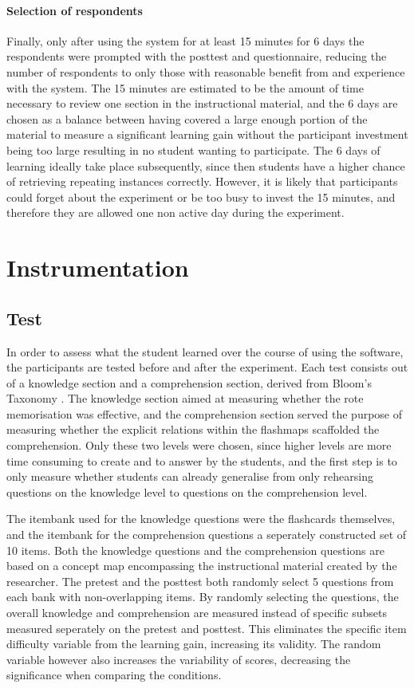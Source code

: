 \paragraph{Selection of respondents} Finally, only after using the system for at least 15 minutes for 6 days the respondents were prompted with the posttest and questionnaire, reducing the number of respondents to only those with reasonable benefit from and experience with the system. The 15 minutes are estimated to be the amount of time necessary to review one section in the instructional material, and the 6 days are chosen as a balance between having covered a large enough portion of the material to measure a significant learning gain without the participant investment being too large resulting in no student wanting to participate. The 6 days of learning ideally take place subsequently, since then students have a higher chance of retrieving repeating instances correctly. However, it is likely that participants could forget about the experiment or be too busy to invest the 15 minutes, and therefore they are allowed one non active day during the experiment. 

\section{Instrumentation}
\label{sec:instrumentation}

\subsection{Test}

In order to assess what the student learned over the course of using the software, the participants are tested before and after the experiment. Each test consists out of a knowledge section and a comprehension section, derived from Bloom's Taxonomy \cite{bloom}. The knowledge section aimed at measuring whether the rote memorisation was effective, and the comprehension section served the purpose of measuring whether the explicit relations within the flashmaps scaffolded the comprehension. Only these two levels were chosen, since higher levels are more time consuming to create and to answer by the students, and the first step is to only measure whether students can already generalise from only rehearsing questions on the knowledge level to questions on the comprehension level.

The itembank used for the knowledge questions were the flashcards themselves, and the itembank for the comprehension questions a seperately constructed set of 10 items. Both the knowledge questions and the comprehension questions are based on a concept map encompassing the instructional material created by the researcher. The pretest and the posttest both randomly select 5 questions from each bank with non-overlapping items. By randomly selecting the questions, the overall knowledge and comprehension are measured instead of specific subsets measured seperately on the pretest and posttest. This eliminates the specific item difficulty variable from the learning gain, increasing its validity. The random variable however also increases the variability of scores, decreasing the significance when comparing the conditions.


